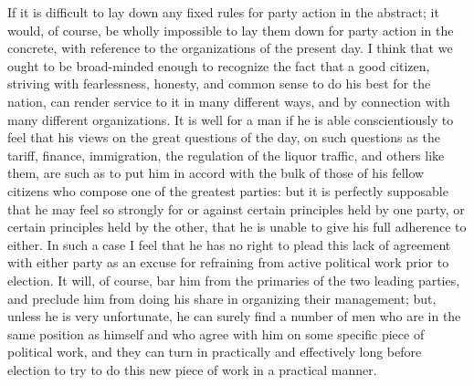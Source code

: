 \documentclass[a4paper]{amsbook}
\begin{document}
If it is difficult to lay down any fixed rules for party action in the abstract; it would, of course, be wholly impossible to lay them down for party action in the concrete, with reference to the organizations of the present day. I think that we ought to be broad-minded enough to recognize the fact that a good citizen, striving with fearlessness, honesty, and common sense to do his best for the nation, can render service to it in many different ways, and by connection with many different organizations. It is well for a man if he is able conscientiously to feel that his views on the great questions of the day, on such questions as the tariff, finance, immigration, the regulation of the liquor traffic, and others like them, are such as to put him in accord with the bulk of those of his fellow citizens who compose one of the greatest parties: but it is perfectly supposable that he may feel so strongly for or against certain principles held by one party, or certain principles held by the other, that he is unable to give his full adherence to either. In such a case I feel that he has no right to plead this lack of agreement with either party as an excuse for refraining from active political work prior to election. It will, of course, bar him from the primaries of the two leading parties, and preclude him from doing his share in organizing their management; but, unless he is very unfortunate, he can surely find a number of men who are in the same position as himself and who agree with him on some specific piece of political work, and they can turn in practically and effectively long before election to try to do this new piece of work in a practical manner.
\end{document}
